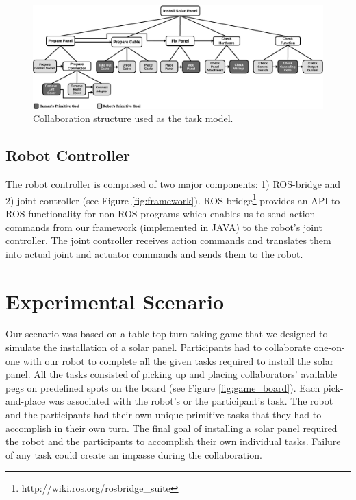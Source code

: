 \documentclass[12pt]{report}
\begin{document}
\begin{figure}[tbh]
  \centering
  \includegraphics[width=1\textwidth]{figure/collaborationStructure.pdf}
  \caption{{\fontsize{9}{9}\selectfont Collaboration structure used as the
  task model.}}
  \label{fig:collaboration_structure}
  \vspace*{-5mm}
\end{figure}

\subsection{Robot Controller}
The robot controller is comprised of two major components: 1) ROS-bridge and 2)
joint controller (see Figure \ref{fig:framework}).
ROS-bridge\footnote{http://wiki.ros.org/rosbridge\_suite} provides an API to ROS
functionality for non-ROS programs which enables us to send action commands from
our framework (implemented in JAVA) to the robot's joint controller. The joint
controller receives action commands and translates them into actual joint and
actuator commands and sends them to the robot.

\section{Experimental Scenario}

Our scenario was based on a table top turn-taking game that we designed to
simulate the installation of a solar panel. Participants had to collaborate
one-on-one with our robot to complete all the given tasks required to install
the solar panel. All the tasks consisted of picking up and placing
collaborators' available pegs on predefined spots on the board (see Figure
\ref{fig:game_board}). Each pick-and-place was associated with the robot's or
the participant's task. The robot and the participants had their own unique
primitive tasks that they had to accomplish in their own turn. The final goal of
installing a solar panel required the robot and the participants to accomplish
their own individual tasks. Failure of any task could create an impasse during
the collaboration.
\end{document}
